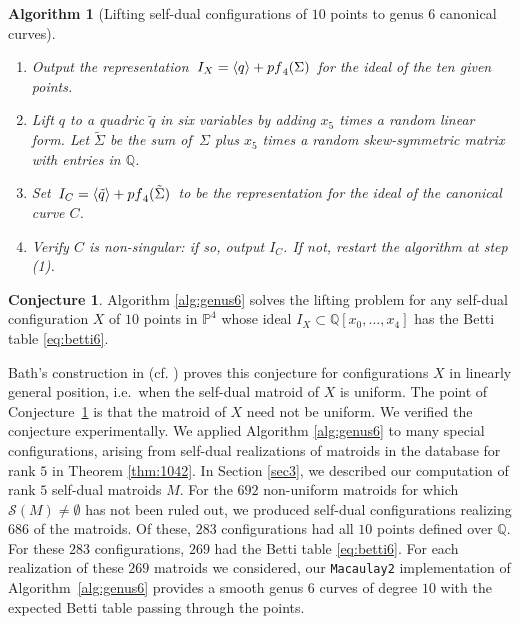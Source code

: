 \documentclass[12pt]{extarticle}
\newtheorem{algo}[theorem]{Algorithm}
\theoremstyle{definition}
\newtheorem{conjecture}[theorem]{Conjecture}
\numberwithin{theorem}{section}
\theoremstyle{plain}\newtheorem{ithm}{Theorem}
\newcommand{\PP}{\mathbb{P}}
\newcommand{\QQ}{\mathbb{Q}}
\begin{document}
\begin{algo}[Lifting self-dual configurations of $10$ points to genus $6$ canonical curves]
\begin{enumerate}
five $4 \times 4$ subpfaffians  of $\,\Sigma$ 
is contained in $I_X$. At least one of
the six generators of $I_X$ does not lie in ${\rm pf}_4(\Sigma)$.
Let $q$ be such a quadric. \vspace{-0.2cm}
\item Output the representation $\,I_X = \langle q \rangle + {\rm pf}_4(\Sigma)\,$ for the ideal of the ten given points.
\vspace{-0.2cm}
\item Lift $q$ to a quadric $\tilde q$ in six variables
by adding $x_5$ times a random linear form.
Let $\tilde \Sigma$ be the sum of $\,\Sigma$ 
plus $x_5$ times a random skew-symmetric matrix with entries in $\QQ$. \vspace{-0.2cm}
\item Set $\,I_C = \langle \tilde q \rangle + {\rm pf}_4(\tilde \Sigma)\,$ to be the representation  for the ideal of the canonical curve $C$.\vspace{-0.2cm}
\item Verify $C$ is non-singular: if so, output $I_C$.
If not, restart the algorithm at step (1).

\end{enumerate}
\end{algo}
\begin{conjecture}
 \label{conj:alggenus}
Algorithm \ref{alg:genus6} solves
the lifting problem for any self-dual configuration $X$ of $10$ points in $\PP^4$ whose ideal $I_X \subset \QQ[x_0, \dots, x_4]$ has the Betti table \eqref{eq:betti6}. \end{conjecture}

Bath's construction in \cite[Section~2]{Bath} (cf. \cite[Theorem~9.10]{EP}) proves this conjecture for configurations $X$ in
linearly general position, i.e.~when the self-dual matroid of $X$ is uniform. The point of
Conjecture~\ref{conj:alggenus} is that the
 matroid of $X$ need not be uniform.
 We verified the conjecture experimentally. We applied Algorithm \ref{alg:genus6} to many special
 configurations, arising from self-dual realizations of matroids in the database for rank $5$ in Theorem \ref{thm:1042}.
In Section \ref{sec3}, we described our computation of rank $5$ self-dual matroids $M$. 
For the $692$ non-uniform matroids for which $\mathcal{S}(M) \not= \emptyset$ 
has not been ruled out, we produced self-dual configurations realizing $686$ of the matroids. Of these, $283$ configurations had all $10$ points defined over $\QQ$. For these $283$ configurations, $269$ had the Betti table \eqref{eq:betti6}. For each realization of these $269$ matroids we considered, our {\tt Macaulay2} implementation of
Algorithm~\ref{alg:genus6} provides a smooth genus $6$ curves of degree $10$ with the expected Betti table passing through the points.
\end{document}
